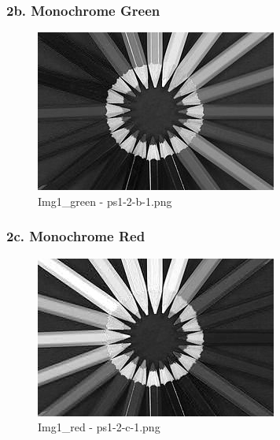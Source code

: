 	\begin{frame}
		\frametitle{2b. Monochrome Green}
		
		\begin{figure}[!htb]
			\centering
			\includegraphics[height=0.65\textheight]{./output/ps1-2-b-1.png}
			\caption{Img1\_green - ps1-2-b-1.png} 
		\end{figure}	
		
	\end{frame}

	\begin{frame}
		\frametitle{2c. Monochrome Red}
		
		\begin{figure}[!htb]
			\centering
			\includegraphics[height=0.65\textheight]{./output/ps1-2-c-1.png}
			\caption{Img1\_red - ps1-2-c-1.png} 
		\end{figure}	
		
	\end{frame}

